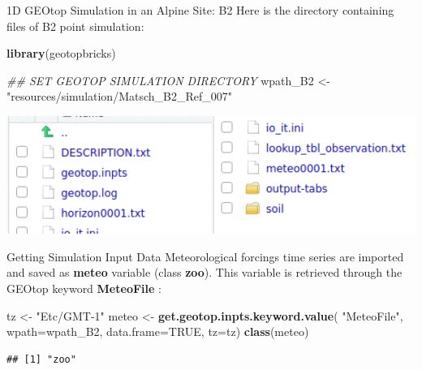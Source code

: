 \documentclass[
  ignorenonframetext,
]{beamer}
\newenvironment{Shaded}{\begin{snugshade}}{\end{snugshade}}
\newcommand{\CommentTok}[1]{\textcolor[rgb]{0.56,0.35,0.01}{\textit{#1}}}
\newcommand{\DataTypeTok}[1]{\textcolor[rgb]{0.13,0.29,0.53}{#1}}
\newcommand{\KeywordTok}[1]{\textcolor[rgb]{0.13,0.29,0.53}{\textbf{#1}}}
\newcommand{\NormalTok}[1]{#1}
\newcommand{\OtherTok}[1]{\textcolor[rgb]{0.56,0.35,0.01}{#1}}
\newcommand{\StringTok}[1]{\textcolor[rgb]{0.31,0.60,0.02}{#1}}
\begin{document}
\begin{frame}[fragile]{1D GEOtop Simulation in an Alpine Site: B2}
\protect\hypertarget{d-geotop-simulation-in-an-alpine-site-b2}{}
Here is the directory containing files of B2 point simulation:

\begin{Shaded}
\begin{Highlighting}[]
\KeywordTok{library}\NormalTok{(geotopbricks) }

\CommentTok{\#\# SET GEOTOP SIMULATION DIRECTORY}
\NormalTok{wpath\_B2 <{-}}\StringTok{ "resources/simulation/Matsch\_B2\_Ref\_007"} 
\end{Highlighting}
\end{Shaded}

\includegraphics[width=1\textwidth,height=\textheight]{resources/images/geotop_folder_B2.png}\\
\end{frame}

\begin{frame}[fragile]{Getting Simulation Input Data}
\protect\hypertarget{getting-simulation-input-data}{}
Meteorological forcings time series are imported and saved as
\textbf{meteo} variable (class \textbf{zoo}). This variable is retrieved
through the GEOtop keyword \textbf{MeteoFile} :

\begin{Shaded}
\begin{Highlighting}[]
\NormalTok{tz <{-}}\StringTok{ "Etc/GMT{-}1"}
\NormalTok{meteo <{-}}\StringTok{ }\KeywordTok{get.geotop.inpts.keyword.value}\NormalTok{(}
  \StringTok{"MeteoFile"}\NormalTok{,}
  \DataTypeTok{wpath=}\NormalTok{wpath\_B2,}
  \DataTypeTok{data.frame=}\OtherTok{TRUE}\NormalTok{,}
  \DataTypeTok{tz=}\NormalTok{tz)}
\KeywordTok{class}\NormalTok{(meteo)}
\end{Highlighting}
\end{Shaded}

\begin{verbatim}
## [1] "zoo"
\end{verbatim}
\end{frame}
\end{document}
